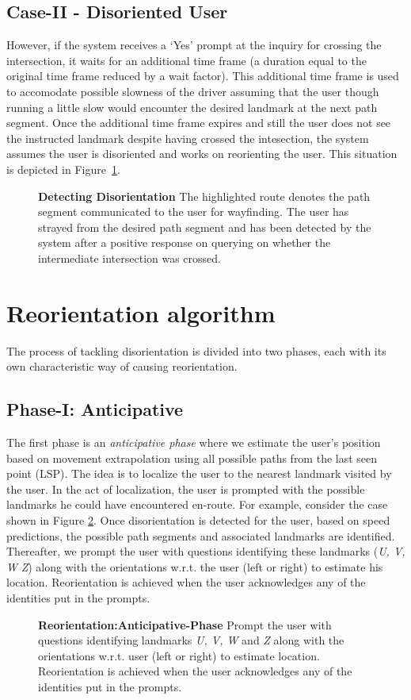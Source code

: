 \documentclass{iitkthesis}
\begin{document}
\subsection*{Case-II - Disoriented User}
However, if the system receives a `Yes' prompt at the inquiry for 
crossing the intersection, it waits for an additional time frame (a duration
equal to the original time frame reduced by a wait factor). This 
additional time frame is used to accomodate possible slowness of the 
driver assuming that the user though running a little slow would 
encounter the desired landmark at the next path segment. Once the 
additional time frame expires and still the user does not see the instructed 
landmark despite having crossed the intesection, the system assumes the
user is disoriented and works on reorienting the user.
This situation is depicted in Figure~\ref{fig:detect}. 
\begin{figure}
\centering
{}
\caption{\textbf{Detecting Disorientation} The highlighted route denotes 
the path segment communicated to the user for wayfinding. The user has 
strayed from the desired path segment and has been detected by the 
system after a positive response on querying on whether the intermediate 
intersection was crossed.}
\label{fig:detect}
 \end{figure}
\section{Reorientation algorithm}
\label{sec:reorient}
The process of tackling disorientation is divided into two phases, each 
with its own characteristic way of causing reorientation. 
\subsection*{Phase-I: Anticipative}
The first phase is an \textit{anticipative phase} where we estimate the user's 
position based on movement extrapolation using all possible paths from 
the last seen point (LSP). The idea is to localize the user to the 
nearest landmark visited by the user. In the act of localization, the 
user is prompted with the possible landmarks he could have encountered 
en-route. For example, consider the case shown in Figure 
\ref{fig:anticipative}. Once disorientation is detected for the user, 
based on speed predictions, the possible path 
segments and associated landmarks are identified. Thereafter, we prompt 
the user with questions identifying these landmarks (\textit{U, V, W} 
\textit{Z}) along with the orientations w.r.t. the user (left or right) to 
estimate his location. Reorientation is achieved when the user 
acknowledges any of the identities put in the prompts.
\begin{figure}
\centering
{}
\caption{\textbf{Reorientation:Anticipative-Phase} Prompt the user with 
questions identifying landmarks \textit{U, V, W} and \textit{Z} along 
with the orientations w.r.t. user (left or right) to estimate location. 
Reorientation is achieved when the user acknowledges any of the 
identities put in the prompts.}
\label{fig:anticipative}
 \end{figure}
\end{document}
